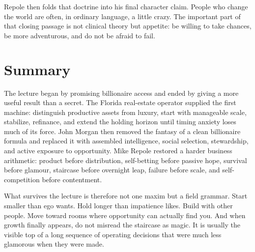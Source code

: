 Repole then folds that doctrine into his final character claim. People who change the world are often, in ordinary language, a little crazy. The important part of that closing passage is not clinical theory but appetite: be willing to take chances, be more adventurous, and do not be afraid to fail.

\section{Summary}

The lecture began by promising billionaire access and ended by giving a more useful result than a secret. The Florida real-estate operator supplied the first machine: distinguish productive assets from luxury, start with manageable scale, stabilize, refinance, and extend the holding horizon until timing anxiety loses much of its force. John Morgan then removed the fantasy of a clean billionaire formula and replaced it with assembled intelligence, social selection, stewardship, and active exposure to opportunity. Mike Repole restored a harder business arithmetic: product before distribution, self-betting before passive hope, survival before glamour, staircase before overnight leap, failure before scale, and self-competition before contentment.

What survives the lecture is therefore not one maxim but a field grammar. Start smaller than ego wants. Hold longer than impatience likes. Build with other people. Move toward rooms where opportunity can actually find you. And when growth finally appears, do not misread the staircase as magic. It is usually the visible top of a long sequence of operating decisions that were much less glamorous when they were made.